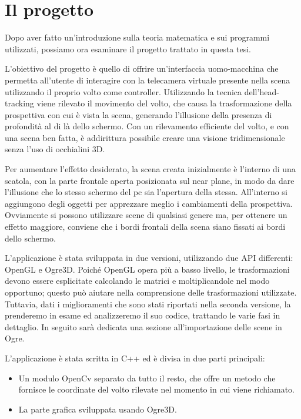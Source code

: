 \chapter{Il progetto}

Dopo aver fatto un'introduzione sulla teoria matematica e sui programmi utilizzati, possiamo ora esaminare il progetto trattato in questa tesi.

L'obiettivo del progetto è quello di offrire un'interfaccia uomo-macchina che permetta all'utente di interagire con la telecamera virtuale presente nella scena utilizzando il proprio volto come controller. Utilizzando la tecnica dell'head-tracking viene rilevato il movimento del volto, che causa la trasformazione della prospettiva con cui è vista la scena, generando l'illusione della presenza di profondità al di là dello schermo. Con un rilevamento efficiente del volto, e con una scena ben fatta, è addirittura possibile creare una visione tridimensionale senza l'uso di occhialini 3D.

Per aumentare l'effetto desiderato, la scena creata inizialmente è l'interno di una scatola, con la parte frontale aperta posizionata sul near plane, in modo da dare l'illusione che lo stesso schermo del pc sia l'apertura della stessa. All'interno si aggiungono degli oggetti per apprezzare meglio i cambiamenti della prospettiva. Ovviamente si possono utilizzare scene di qualsiasi genere ma, per ottenere un effetto maggiore, conviene che i bordi frontali della scena siano fissati ai bordi dello schermo.

L'applicazione è stata sviluppata in due versioni, utilizzando due API differenti: OpenGL e Ogre3D.
Poiché OpenGL opera più a basso livello, le trasformazioni devono essere esplicitate calcolando le matrici e moltiplicandole nel modo opportuno; questo può aiutare nella comprensione delle trasformazioni utilizzate. Tuttavia, dati i miglioramenti che sono stati riportati nella seconda versione, la prenderemo in esame ed analizzeremo il suo codice, trattando le varie fasi in dettaglio.
In seguito sarà dedicata una sezione all'importazione delle scene in Ogre.

L'applicazione è stata scritta in C++ ed è divisa in due parti principali:
\begin{itemize}
\item Un modulo OpenCv separato da tutto il resto, che offre un metodo che fornisce le coordinate del volto rilevate nel momento in cui viene richiamato.
\item La parte grafica sviluppata usando Ogre3D.
\end{itemize}


